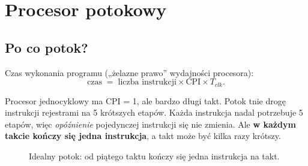 \chapter{Procesor potokowy}
\label{ch:pipe}


\newcommand{\instr}[4]{%
  \node[anchor=east, font=\ttfamily\scriptsize] at (0.9,-#1) {#4};
  \foreach \s [count=\k from 0] in {#3} {
    \ifx\s\empty\else
    \pgfmathsetmacro{\xx}{#2+\k}
    \node[draw, thick, minimum width=9.5mm, minimum height=5mm, inner sep=0pt,
      font=\sffamily\scriptsize, fill=akcentjasny] at (\xx,-#1) {\s};
    \fi
  }}
\newcommand{\banka}[2]{%
  \node[draw, thick, dashed, minimum width=9.5mm, minimum height=5mm, inner sep=0pt,
    font=\sffamily\tiny, fill=white, text=szary] at (#2,-#1) {bańka};}
\newcommand{\takty}[1]{%
  \foreach \t in {1,...,#1} { \node[font=\sffamily\scriptsize, text=szary] at (\t+1,0.6) {\t}; }}

\section{Po co potok?}

Czas wykonania programu („żelazne prawo” wydajności procesora):
\[ \text{czas} \;=\; \text{liczba instrukcji} \times \text{CPI} \times T_{clk}. \]

Procesor jednocyklowy ma CPI = 1, ale bardzo długi takt. Potok tnie drogę
instrukcji rejestrami na 5 krótszych etapów. Każda instrukcja nadal potrzebuje 5
etapów, więc \emph{opóźnienie} pojedynczej instrukcji się nie zmienia. Ale \textbf{w
każdym takcie kończy się jedna instrukcja}, a takt może być kilka razy krótszy.

\begin{figure}[h]
\centering
{}
\caption{Idealny potok: od piątego taktu kończy się jedna instrukcja na takt.}
\label{fig:pipe}
\end{figure}

